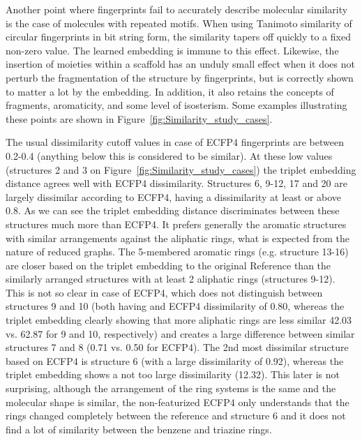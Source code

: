 \documentclass[doublespacing]{bmcart}
\begin{document}
Another point where fingerprints fail to accurately describe molecular similarity is the case of molecules with repeated motifs. When using Tanimoto similarity of circular fingerprints in bit string form, the similarity tapers off quickly to a fixed non-zero value. The learned embedding is immune to this effect. Likewise, the insertion of moieties within a scaffold has an unduly small effect when it does not perturb the fragmentation of the structure by fingerprints, but is correctly shown to matter a lot by the embedding. In addition, it also retains the concepts of fragments, aromaticity, and some level of isosterism. Some examples illustrating these points are shown in Figure~\ref{fig:Similarity_study_cases}.

The usual dissimilarity cutoff values in case of ECFP4 fingerprints are between 0.2-0.4 (anything below this is considered to be similar). At these low values (structures 2 and 3 on Figure~\ref{fig:Similarity_study_cases}) the triplet embedding distance agrees well with ECFP4 dissimilarity.  Structures 6, 9-12, 17 and 20 are largely dissimilar according to ECFP4, having a dissimilarity at least or above 0.8. As we can see the triplet embedding distance discriminates between these structures much more than ECFP4. It prefers generally the aromatic structures with similar arrangements against the aliphatic rings, what is expected from the nature of reduced graphs. The 5-membered aromatic rings (e.g. structure 13-16) are closer based on the triplet embedding to the original Reference than the similarly arranged structures with at least 2 aliphatic rings (structures 9-12). This is not so clear in case of ECFP4, which does not distinguish between structures 9 and 10 (both having and ECFP4 dissimilarity of 0.80, whereas the triplet embedding clearly showing that more aliphatic rings are less similar 42.03 vs. 62.87 for 9 and 10, respectively) and creates a large difference between similar structures 7 and 8 (0.71 vs. 0.50 for ECFP4). The 2nd most dissimilar structure based on ECFP4 is structure 6 (with a large dissimilarity of 0.92), whereas the triplet embedding shows a not too large dissimilarity (12.32). This later is not surprising, although the arrangement of the ring systems is the same and the molecular shape is similar, the non-featurized ECFP4 only understands that the rings changed completely between the reference and structure 6 and it does not find a lot of similarity between the benzene and triazine rings.
\end{document}
